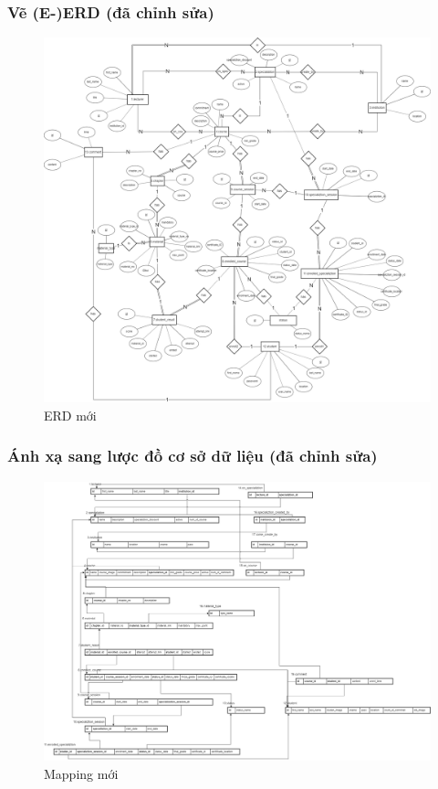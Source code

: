 \documentclass[12pt,a4paper,titlepage]{article}
\begin{document}
\subsubsection{Vẽ (E-)ERD (đã chỉnh sửa)}
\newpage
\begin{figure}[h!]
	\centering
	\caption{ERD mới}
	\includegraphics[width=1.0\textwidth]{images/newerd.png}
\end{figure}
\subsubsection{Ánh xạ sang lược đồ cơ sở dữ liệu (đã chỉnh sửa)}
\newpage
\begin{figure}[h!]
	\centering
	\caption{Mapping mới}
	\includegraphics[width=1.0\textwidth]{images/map.png}
\end{figure}
\end{document}
